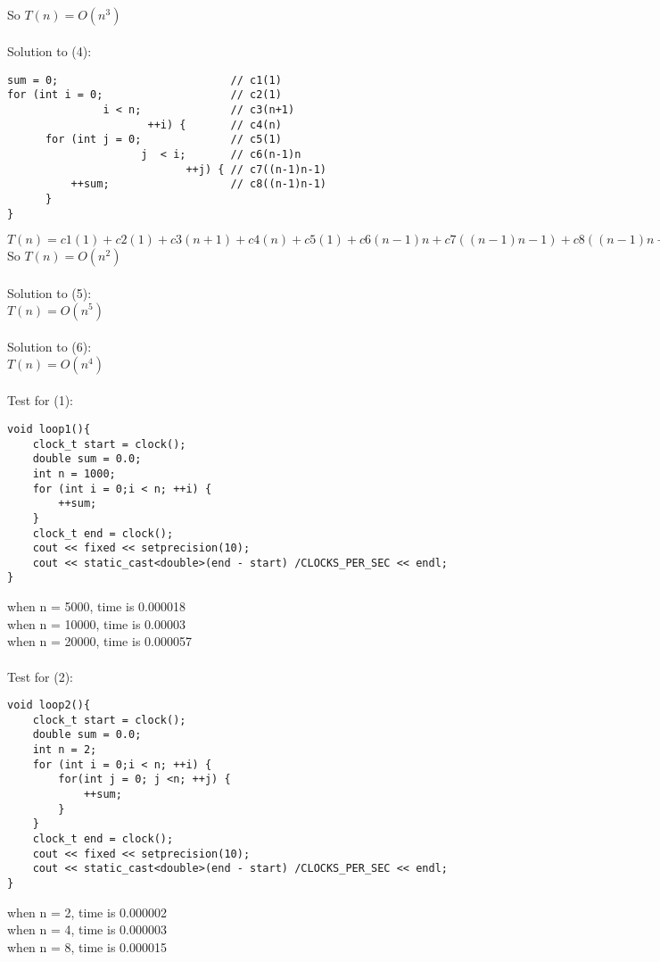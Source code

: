 \documentclass[12pt]{article}
\begin{document}
\begin{enumerate}
\\So $T(n) = O(n^3)$
\\\\Solution to (4):
\\\begin{verbatim}
sum = 0;                           // c1(1)
for (int i = 0;                    // c2(1)
               i < n;              // c3(n+1)
                      ++i) {       // c4(n)
      for (int j = 0;              // c5(1)
                     j  < i;       // c6(n-1)n
                            ++j) { // c7((n-1)n-1)
          ++sum;                   // c8((n-1)n-1)
      }                  
}
\end{verbatim}
$T(n) = c1(1)+c2(1)+c3(n+1)+c4(n)+c5(1) +c6(n-1)n+c7((n-1)n-1)+c8((n-1)n-1)$
\\So $T(n) = O(n^2)$
\\\\Solution to (5):
\\$T(n) = O(n^5)$
\\\\Solution to (6):
\\$T(n) = O(n^4)$
\\\\Test for (1):
\\\begin{verbatim}
void loop1(){
    clock_t start = clock();
    double sum = 0.0;
    int n = 1000;
    for (int i = 0;i < n; ++i) {
        ++sum;
    }
    clock_t end = clock();
    cout << fixed << setprecision(10);
    cout << static_cast<double>(end - start) /CLOCKS_PER_SEC << endl;
}
\end{verbatim}
when n = 5000, time is 0.000018
\\when n = 10000, time is 0.00003
\\when n = 20000, time is 0.000057
\\\\Test for (2):
\\\begin{verbatim}
void loop2(){
    clock_t start = clock();
    double sum = 0.0;
    int n = 2;
    for (int i = 0;i < n; ++i) {
        for(int j = 0; j <n; ++j) {
            ++sum;
        }
    }
    clock_t end = clock();
    cout << fixed << setprecision(10);
    cout << static_cast<double>(end - start) /CLOCKS_PER_SEC << endl;
}
\end{verbatim}
when n = 2, time is 0.000002
\\when n = 4, time is 0.000003
\\when n = 8, time is 0.000015

\end{enumerate}
\end{document}
